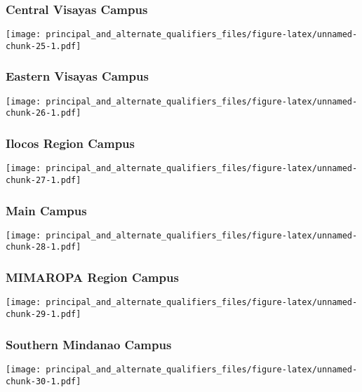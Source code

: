 \documentclass[]{article}
\begin{document}
\hypertarget{central-visayas-campus}{%
\subsubsection{Central Visayas Campus}\label{central-visayas-campus}}

\texttt{[image: principal\_and\_alternate\_qualifiers\_files/figure-latex/unnamed-chunk-25-1.pdf]}

\hypertarget{eastern-visayas-campus}{%
\subsubsection{Eastern Visayas Campus}\label{eastern-visayas-campus}}

\texttt{[image: principal\_and\_alternate\_qualifiers\_files/figure-latex/unnamed-chunk-26-1.pdf]}

\hypertarget{ilocos-region-campus}{%
\subsubsection{Ilocos Region Campus}\label{ilocos-region-campus}}

\texttt{[image: principal\_and\_alternate\_qualifiers\_files/figure-latex/unnamed-chunk-27-1.pdf]}

\hypertarget{main-campus}{%
\subsubsection{Main Campus}\label{main-campus}}

\texttt{[image: principal\_and\_alternate\_qualifiers\_files/figure-latex/unnamed-chunk-28-1.pdf]}

\hypertarget{mimaropa-region-campus}{%
\subsubsection{MIMAROPA Region Campus}\label{mimaropa-region-campus}}

\texttt{[image: principal\_and\_alternate\_qualifiers\_files/figure-latex/unnamed-chunk-29-1.pdf]}

\hypertarget{southern-mindanao-campus}{%
\subsubsection{Southern Mindanao
Campus}\label{southern-mindanao-campus}}

\texttt{[image: principal\_and\_alternate\_qualifiers\_files/figure-latex/unnamed-chunk-30-1.pdf]}
\end{document}
